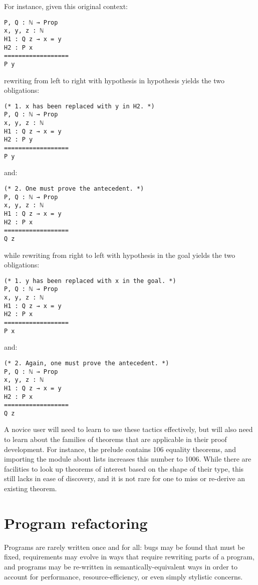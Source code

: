 For instance, given this original context:

\begin{verbatim}
P, Q : ℕ → Prop
x, y, z : ℕ
H1 : Q z → x = y
H2 : P x
==================
P y
\end{verbatim}

rewriting from left to right with hypothesis  in hypothesis
 yields the two obligations:

\begin{verbatim}
(* 1. x has been replaced with y in H2. *)
P, Q : ℕ → Prop
x, y, z : ℕ
H1 : Q z → x = y
H2 : P y
==================
P y
\end{verbatim}

and:

\begin{verbatim}
(* 2. One must prove the antecedent. *)
P, Q : ℕ → Prop
x, y, z : ℕ
H1 : Q z → x = y
H2 : P x
==================
Q z
\end{verbatim}

while rewriting from right to left with hypothesis  in the goal
yields the two obligations:

\begin{verbatim}
(* 1. y has been replaced with x in the goal. *)
P, Q : ℕ → Prop
x, y, z : ℕ
H1 : Q z → x = y
H2 : P x
==================
P x
\end{verbatim}

and:

\begin{verbatim}
(* 2. Again, one must prove the antecedent. *)
P, Q : ℕ → Prop
x, y, z : ℕ
H1 : Q z → x = y
H2 : P x
==================
Q z
\end{verbatim}

A novice user will need to learn to use these tactics effectively, but will also
need to learn about the families of theorems that are applicable in their proof
development.  For instance, the \Coq{} prelude contains 106 equality theorems,
and importing the module about lists increases this number to 1006.  While there
are facilities to look up theorems of interest based on the shape of their type,
this still lacks in ease of discovery, and it is not rare for one to miss or
re-derive an existing theorem.

\section{Program refactoring}

Programs are rarely written once and for all: bugs may be found that must be
fixed, requirements may evolve in ways that require rewriting parts of a
program, and programs may be re-written in semantically-equivalent ways in order
to account for performance, resource-efficiency, or even simply stylistic
concerns.

